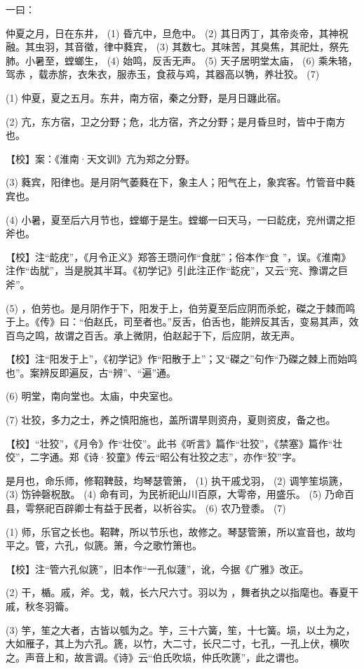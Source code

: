 \documentclass[12pt,UTF8]{ctexbook}
\begin{document}
一曰：

仲夏之月，日在东井， (1) 昏亢中，旦危中。 (2) 其日丙丁，其帝炎帝，其神祝融。其虫羽，其音徵，律中蕤宾， (3) 其数七。其味苦，其臭焦，其祀灶，祭先肺。小暑至，螳螂生， (4) 始鸣，反舌无声。 (5) 天子居明堂太庙， (6) 乘朱辂，驾赤 ，载赤旂，衣朱衣，服赤玉，食菽与鸡，其器高以觕，养壮狡。 (7)

(1) 仲夏，夏之五月。东井，南方宿，秦之分野，是月日躔此宿。

(2) 亢，东方宿，卫之分野；危，北方宿，齐之分野；是月昏旦时，皆中于南方也。

【校】案：《淮南·天文训》亢为郑之分野。

(3) 蕤宾，阳律也。是月阴气萎蕤在下，象主人；阳气在上，象宾客。竹管音中蕤宾也。

(4) 小暑，夏至后六月节也，螳螂于是生。螳螂一曰天马，一曰龁疣，兖州谓之拒斧也。

【校】注“龁疣”，《月令正义》郑答王瓒问作“食肬”；俗本作“食 ”，误。《淮南》注作“齿肬”，当是脱其半耳。《初学记》引此注正作“龁疣”，又云“兖、豫谓之巨斧”。

(5) ，伯劳也。是月阴作于下，阳发于上，伯劳夏至后应阴而杀蛇，磔之于棘而鸣于上。《传》曰：“伯赵氏，司至者也。”反舌，伯舌也，能辨反其舌，变易其声，效百鸟之鸣，故谓之百舌。承上微阴，伯赵起于下，后应阴，故无声。

【校】注“阳发于上”，《初学记》作“阳散于上”；又“磔之”句作“乃磔之棘上而始鸣也”。案辨反即遍反，古“辨”、“遍”通。

(6) 明堂，南向堂也。太庙，中央室也。

(7) 壮狡，多力之士，养之慎阳施也，盖所谓旱则资舟，夏则资皮，备之也。

【校】“壮狡”，《月令》作“壮佼”。此书《听言》篇作“壮狡”，《禁塞》篇作“壮佼”，二字通。郑《诗·狡童》传云“昭公有壮狡之志”，亦作“狡”字。

是月也，命乐师，修鞀鞞鼓，均琴瑟管箫， (1) 执干戚戈羽， (2) 调竽笙埙篪， (3) 饬钟磬柷敔。 (4) 命有司，为民祈祀山川百原，大雩帝，用盛乐。 (5) 乃命百县，雩祭祀百辟卿士有益于民者，以祈谷实。 (6) 农乃登黍。 (7)

(1) 师，乐官之长也。鞀鞞，所以节乐也，故修之。琴瑟管箫，所以宣音也，故均平之。管，六孔，似篪。箫，今之歌竹箫也。

【校】注“管六孔似篪”，旧本作“一孔似蘧”，讹，今据《广雅》改正。

(2) 干，楯。戚，斧。戈，戟，长六尺六寸。羽以为 ，舞者执之以指麾也。春夏干戚，秋冬羽籥。

(3) 竽，笙之大者，古皆以瓠为之。竽，三十六簧，笙，十七簧。埙，以土为之，大如雁子，其上为六孔。篪，以竹，大二寸，长尺二寸，七孔，一孔上伏，横吹之。声音上和，故言调。《诗》云“伯氏吹埙，仲氏吹篪”，此之谓也。
\end{document}
